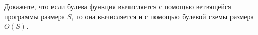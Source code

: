 Докажите, что если булева функция вычисляется с помощью ветвящейся программы размера $S$, то она вычисляется и с помощью
булевой схемы размера $O(S)$.